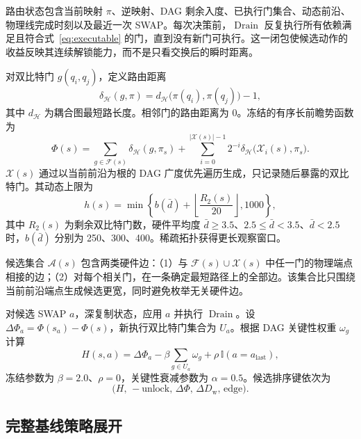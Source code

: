 \documentclass[11pt,a4paper]{article}
\newcommand{\Hardware}{\mathcal H}
\newcommand{\Front}{\mathcal F}
\newcommand{\Extended}{\mathcal X}
\newcommand{\Candidates}{\mathcal A}
\newcommand{\RouteDist}{\delta_{\Hardware}}
\newcommand{\DepthW}{D_{\mathrm w}}
\newcommand{\Drain}{\operatorname{Drain}}
\begin{document}
路由状态包含当前映射 $\pi$、逆映射、DAG 剩余入度、已执行门集合、动态前沿、物理线完成时刻以及最近一次 SWAP。每次决策前，$\Drain$ 反复执行所有依赖满足且符合式~\eqref{eq:executable} 的门，直到没有新门可执行。这一闭包使候选动作的收益反映其连续解锁能力，而不是只看交换后的瞬时距离。

对双比特门 $g(q_i,q_j)$，定义路由距离
\begin{equation}
  \RouteDist(g,\pi)
  =d_{\Hardware}\bigl(\pi(q_i),\pi(q_j)\bigr)-1,
\end{equation}
其中 $d_{\Hardware}$ 为耦合图最短路长度。相邻门的路由距离为 0。冻结的有序长前瞻势函数为
\begin{equation}
  \Phi(s)
  =\sum_{g\in \Front(s)}\RouteDist(g,\pi_s)
  +\sum_{i=0}^{|\Extended(s)|-1}2^{-i}
   \RouteDist\bigl(\Extended_i(s),\pi_s\bigr).
  \label{eq:potential}
\end{equation}
$\Extended(s)$ 通过以当前前沿为根的 DAG 广度优先遍历生成，只记录随后暴露的双比特门。其动态上限为
\begin{equation}
  h(s)=\min\left\{b(\bar d)+
  \left\lfloor\frac{R_2(s)}{20}\right\rfloor,1000\right\},
\end{equation}
其中 $R_2(s)$ 为剩余双比特门数，硬件平均度 $\bar d\ge3.5$、$2.5\le\bar d<3.5$、$\bar d<2.5$ 时，$b(\bar d)$ 分别为 250、300、400。稀疏拓扑获得更长观察窗口。

候选集合 $\Candidates(s)$ 包含两类硬件边：（1）与 $\Front(s)\cup\Extended(s)$ 中任一门的物理端点相接的边；（2）对每个相关门，在一条确定最短路径上的全部边。该集合比只围绕当前前沿端点生成候选更宽，同时避免枚举无关硬件边。

对候选 SWAP $a$，深复制状态，应用 $a$ 并执行 $\Drain$。设 $\Delta\Phi_a=\Phi(s_a)-\Phi(s)$，新执行双比特门集合为 $U_a$。根据 DAG 关键性权重 $\omega_g$ 计算
\begin{equation}
  H(s,a)=\Delta\Phi_a
  -\beta\sum_{g\in U_a}\omega_g
  +\rho\,\mathbb I(a=a_{\mathrm{last}}),
  \label{eq:heuristic}
\end{equation}
冻结参数为 $\beta=2.0$、$\rho=0$，关键性衰减参数为 $\alpha=0.5$。候选排序键依次为
\begin{equation}
  \bigl(H,\,-\text{unlock},\,\Delta\Phi,\,
  \Delta\DepthW,\,\text{edge}\bigr).
  \label{eq:candidate-key}
\end{equation}

\subsection{完整基线策略展开}
\end{document}
